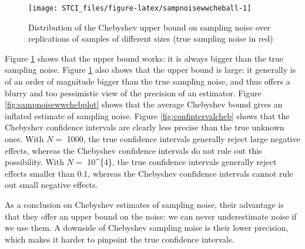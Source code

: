 \documentclass[]{book}
\theoremstyle{definition}
\theoremstyle{definition}
\theoremstyle{definition}
\theoremstyle{remark}
\begin{document}
\begin{figure}[htbp]

{\centering \texttt{[image: STCI\_files/figure-latex/sampnoisewwcheball-1]} 

}

\caption{Distribution of the Chebyshev upper bound on sampling noise over replications of samples of different sizes (true sampling noise in red)}\label{fig:sampnoisewwcheball}
\end{figure}

Figure \ref{fig:sampnoisewwcheball} shows that the upper bound works: it
is always bigger than the true sampling noise. Figure
\ref{fig:sampnoisewwcheball} also shows that the upper bound is large:
it generally is of an order of magnitude bigger than the true sampling
noise, and thus offers a blurry and too pessimistic view of the
precision of an estimator. Figure \ref{fig:sampnoisewwchebplot} shows
that the average Chebyshev bound gives an inflated estimate of sampling
noise. Figure \ref{fig:confintervalcheb} shows that the Chebyshev
confidence intervals are clearly less precise than the true unknown
ones. With \(N=\) 1000, the true confidence intervals generally reject
large negative effects, whereas the Chebyshev confidence intervals do
not rule out this possibility. With \(N=\) 10\^{}\{4\}, the true
confidence intervals generally reject effects smaller than 0.1, whereas
the Chebyshev confidence intervals cannot rule out small negative
effects.

As a conclusion on Chebyshev estimates of sampling noise, their
advantage is that they offer an upper bound on the noise: we can never
underestimate noise if we use them. A downside of Chebyshev sampling
noise is their lower precision, which makes it harder to pinpoint the
true confidence intervals.
\end{document}
